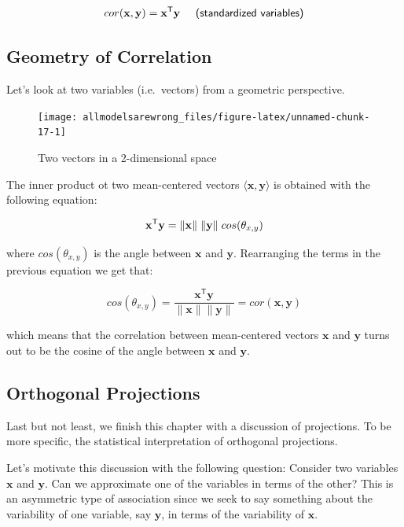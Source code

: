 \documentclass[]{book}
\begin{document}
\[
cor(\mathbf{x, y}) = \mathbf{x^{\mathsf{T}} y} \hspace{5mm} \textsf{(standardized variables)}
\]

\hypertarget{geometry-of-correlation}{%
\subsection{Geometry of Correlation}\label{geometry-of-correlation}}

Let's look at two variables (i.e.~vectors) from a geometric perspective.

\begin{figure}

{\centering \texttt{[image: allmodelsarewrong\_files/figure-latex/unnamed-chunk-17-1]} 

}

\caption{Two vectors in a 2-dimensional space}\label{fig:unnamed-chunk-17}
\end{figure}

The inner product ot two mean-centered vectors \(\langle \mathbf{x}, \mathbf{y} \rangle\) is obtained with the following equation:

\[
\mathbf{x^{\mathsf{T}} y} = \|\mathbf{x}\| \hspace{1mm} \|\mathbf{y}\| \hspace{1mm} cos(\theta_{x,y})
\]

where \(cos(\theta_{x,y})\) is the angle between \(\mathbf{x}\) and \(\mathbf{y}\). Rearranging the terms in the previous equation we get that:

\[
cos(\theta_{x,y}) = \frac{\mathbf{x^\mathsf{T} y}}{\|\mathbf{x}\| \|\mathbf{y}\|} = cor(\mathbf{x, y}) 
\]

which means that the correlation between mean-centered vectors \(\mathbf{x}\) and \(\mathbf{y}\) turns out to be the cosine of the angle between \(\mathbf{x}\) and \(\mathbf{y}\).

\hypertarget{orthogonal-projections}{%
\subsection{Orthogonal Projections}\label{orthogonal-projections}}

Last but not least, we finish this chapter with a discussion of projections.
To be more specific, the statistical interpretation of orthogonal projections.

Let's motivate this discussion with the following question: Consider two
variables \(\mathbf{x}\) and \(\mathbf{y}\). Can we approximate one of the variables
in terms of the other? This is
an asymmetric type of association since we seek to say something about the
variability of one variable, say \(\mathbf{y}\), in terms of the variability of
\(\mathbf{x}\).
\end{document}
